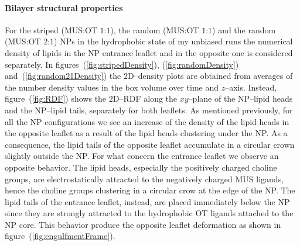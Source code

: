 \paragraph{\textbf{Bilayer structural properties}}
For the striped (\ac{MUS}:\ac{OT} $1$:$1$), the random (\ac{MUS}:\ac{OT} $1$:$1$) and the random (\ac{MUS}:\ac{OT} $2$:$1$) \acp{NP} in the hydrophobic state of my unbiased runs the numerical density of lipids in the \ac{NP} entrance leaflet and in the opposite one is considered separately. In figures~(\ref{fig:stripedDensity}), (\ref{fig:randomDensity}) and~(\ref{fig:random21Density}) the $2$D--density plots are obtained from averages of the number density values in the box volume over time and $z$--axis. Instead, figure~(\ref{fig:RDF}) shows the $2$D--\ac{RDF} along the $xy$--plane of the \ac{NP}--lipid heads and the \ac{NP}--lipid tails, separately for both leaflets. As mentioned previously, for all the \ac{NP} configurations we see an increase of the density of the lipid heads in the opposite leaflet as a result of the lipid heads clustering under the \ac{NP}. As a consequence, the lipid tails of the opposite leaflet accumulate in a circular crown slightly outside the \ac{NP}. For what concern the entrance leaflet we observe an opposite behavior. The lipid heads, especially the positively charged choline groups, are electrostatically attracted to the negatively charged \ac{MUS} ligands, hence the choline groups clustering in a circular crow at the edge of the \ac{NP}. The lipid tails of the entrance leaflet, instead, are placed immediately below the \ac{NP} since they are strongly attracted to the hydrophobic \ac{OT} ligands attached to the \ac{NP} core. This behavior produce the opposite leaflet deformation as shown in figure~(\ref{fig:engulfmentFrame}). 

